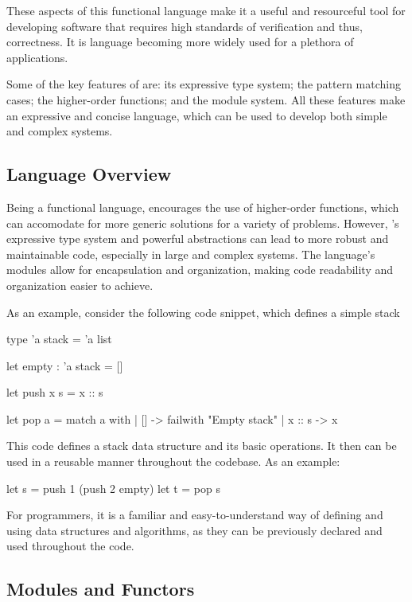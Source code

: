 These aspects of this functional language make it a useful and resourceful tool 
for developing software that requires high standards of verification and thus, correctness.
It is language becoming more widely used for a plethora of applications.

Some of the key features of \ocaml are: its expressive type system; the pattern matching cases; 
the higher-order functions; and the module system. All these features make \ocaml an expressive 
and concise language, which can be used to develop both simple and complex systems.

\subsection{Language Overview} %
\label{sub:language_overview}

Being a functional language, \ocaml encourages the use of higher-order functions, 
which can accomodate for more generic solutions for a variety of problems. However,
\ocaml's expressive type system and powerful abstractions can lead to more robust
and maintainable code, especially in large and complex systems. The language's 
modules allow for encapsulation and organization, making code readability and organization 
easier to achieve.

As an example, consider the following code snippet, which defines a simple stack

\begin{ocamlenv}
    type 'a stack = 'a list

    let empty : 'a stack = []

    let push x s = x :: s

    let pop a =
        match a with
        | [] -> failwith "Empty stack"
        | x :: s -> x
\end{ocamlenv}

This code defines a stack data structure and its basic operations. It then can be used 
in a reusable manner throughout the codebase. As an example:

\begin{ocamlenv}
    let s = push 1 (push 2 empty)
    let t = pop s
\end{ocamlenv}

For programmers, it is a familiar and easy-to-understand way of defining and using 
data structures and algorithms, as they can be previously declared and used throughout 
the code.

\subsection{Modules and Functors} %
\label{sub:modules_and_functors}

